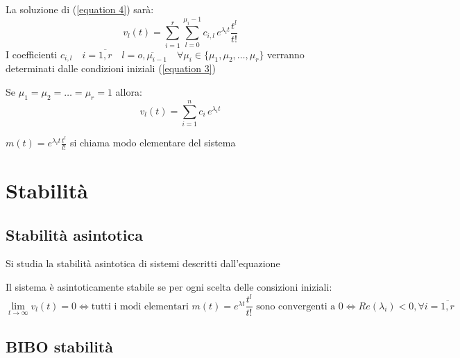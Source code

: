 La soluzione di (\ref{equation 4}) sarà:
\begin{equation}
	v_l(t)=  \sum_{i=1}^{r}\sum_{l=0}^{\mu_i-1}c_{i,l} \,e^{\lambda_it}\frac{t^l}{t!}
	\tag{6}\label{equation 6}
\end{equation}
I coefficienti $c_{i,l}
	\quad i=\overline{1,r} 
	\quad l=\overline{o,\mu_{i-1}}
	\quad \forall\mu_i \in \{\mu_1,\mu_2,\dots,\mu_r\} $ 
	verranno determinati dalle condizioni iniziali (\ref{equation 3})
	
\begin{osservazione}
	Se $\mu_1 = \mu_2 = \dots = \mu_r = 1$ allora:
	\begin{equation*}
		v_l(t)=  \sum_{i=1}^{n}c_{i} \,e^{\lambda_it}
	\end{equation*}
\end{osservazione}

\begin{definizione}
	$m(t) = e^{\lambda_i t} \frac{t^l}{l!} $ si chiama modo elementare del sistema
\end{definizione}


\section{Stabilità}
\subsection{Stabilità asintotica}
Si studia la stabilità asintotica di sistemi descritti dall'equazione %

\begin{theorem}
	Il sistema %
	è asintoticamente stabile se per ogni scelta delle consizioni iniziali:
	\begin{equation*}
		\lim_{t \to \infty}v_l(t)=0
		\Leftrightarrow\text{tutti i modi elementari } m(t)=e^{\lambda t}\frac{t^l}{t!}\text{ sono convergenti a $0$}
		\Leftrightarrow Re(\lambda_i)<0,\forall i = \overline{1,r}
	\end{equation*}
\end{theorem}


\subsection{BIBO stabilità}


